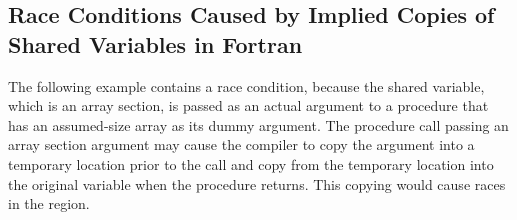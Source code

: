 \pagebreak
\begin{fortranspecific}[4ex]
\section{Race Conditions Caused by Implied Copies of Shared Variables in Fortran}
\label{sec:fort_race}

The following example contains a race condition, because the shared variable, which 
is an array section, is passed as an actual argument to a procedure that has an assumed-size
array as its dummy argument. The procedure call passing an array section argument
may cause the compiler to copy the argument into a temporary location prior to 
the call and copy from the temporary location into the original variable when the 
procedure returns. This copying would cause races in the  region.

\end{fortranspecific}


